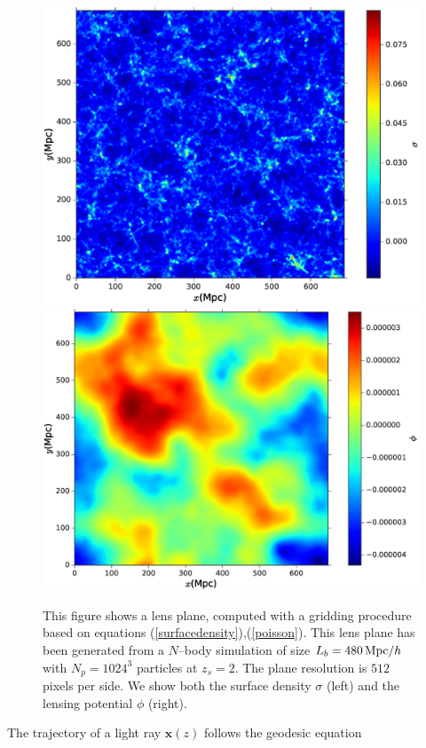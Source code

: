 \documentclass[reprint,aps,prd,superscriptaddress,showkeys,showpacs]{revtex4-1}
\newcommand{\bb}[1]{\mathbf{#1}}
\begin{document}
\begin{figure}
\includegraphics[scale=0.3]{Figures/lens_plane_density.eps}
\includegraphics[scale=0.3]{Figures/lens_plane_potential.eps}
\caption{This figure shows a lens plane, computed with a gridding procedure based on equations (\ref{surfacedensity}),(\ref{poisson}). This lens plane has been generated from a $N$--body simulation of size $L_b=480\,{\rm Mpc}/h$ with $N_p=1024^3$ particles at $z_s=2$. The plane resolution is $512\,\,$pixels per side. We show both the surface density $\sigma$ (left) and the lensing potential $\phi$ (right).}
\label{lensplanefig}
\end{figure}
%
The trajectory of a light ray $\bb{x}(z)$ follows the geodesic equation
\end{document}

